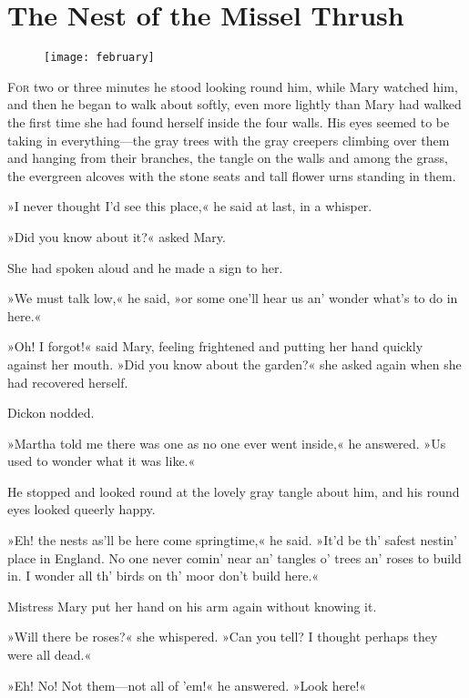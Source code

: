 \chapter{The Nest of the Missel Thrush} 
	
\begin{figure}[t!]
\centering
\texttt{[image: february]}
\end{figure}

 \lettrine[lines=6]{F}{or} two or three minutes he stood looking round him, while Mary watched him, and then he began to walk about softly, even more lightly than Mary had walked the first time she had found herself inside the four walls. His eyes seemed to be taking in everything—the gray trees with the gray creepers climbing over them and hanging from their branches, the tangle on the walls and among the grass, the evergreen alcoves with the stone seats and tall flower urns standing in them.

»I never thought I'd see this place,« he said at last, in a whisper.

»Did you know about it?« asked Mary.

She had spoken aloud and he made a sign to her.

»We must talk low,« he said, »or some one'll hear us an' wonder what's to do in here.«

»Oh! I forgot!« said Mary, feeling frightened and putting her hand quickly against her mouth. »Did you know about the garden?« she asked again when she had recovered herself.

Dickon nodded.

»Martha told me there was one as no one ever went inside,« he answered. »Us used to wonder what it was like.«

He stopped and looked round at the lovely gray tangle about him, and his round eyes looked queerly happy.

»Eh! the nests as'll be here come springtime,« he said. »It'd be th' safest nestin' place in England. No one never comin' near an' tangles o' trees an' roses to build in. I wonder all th' birds on th' moor don't build here.«

Mistress Mary put her hand on his arm again without knowing it.

»Will there be roses?« she whispered. »Can you tell? I thought perhaps they were all dead.«

»Eh! No! Not them—not all of 'em!« he answered. »Look here!«

